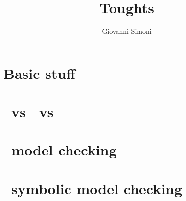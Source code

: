\documentclass[a3paper]{article}
\title{Toughts}
\author{Giovanni Simoni}
\begin{document}
    \maketitle

    \section{Basic stuff}
    
    \newpage

    \section{\LTL\ vs \CTL\ vs \CTLs}
    
    \newpage

    \section{\CTL\ model checking}
    
    \newpage

    \section{\CTL\ symbolic model checking}
    
    \newpage
\end{document}
